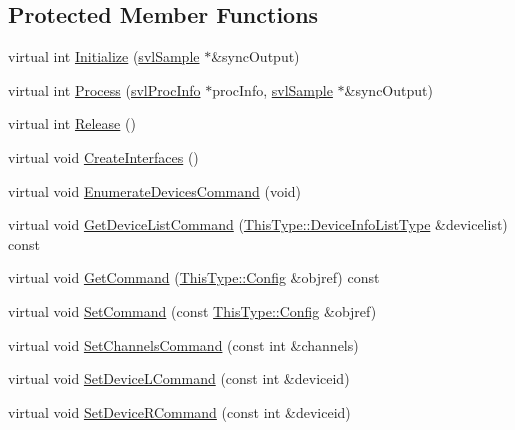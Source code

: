 \subsection*{Protected Member Functions}
\begin{DoxyCompactItemize}
\item 
virtual int \hyperlink{classsvl_filter_source_video_capture_a1da5704a88657e2e84d8215fcbe9e2c3}{Initialize} (\hyperlink{classsvl_sample}{svl\-Sample} $\ast$\&sync\-Output)
\item 
virtual int \hyperlink{classsvl_filter_source_video_capture_a6910f1c5144a593ecd7bfd713944730e}{Process} (\hyperlink{structsvl_proc_info}{svl\-Proc\-Info} $\ast$proc\-Info, \hyperlink{classsvl_sample}{svl\-Sample} $\ast$\&sync\-Output)
\item 
virtual int \hyperlink{classsvl_filter_source_video_capture_a004ca0768d12f5bf38eff0b6274f2beb}{Release} ()
\item 
virtual void \hyperlink{classsvl_filter_source_video_capture_a2fd59f93d8c5e44e67c9dcce01514edd}{Create\-Interfaces} ()
\item 
virtual void \hyperlink{classsvl_filter_source_video_capture_aa910918889f8432791329274497a69d4}{Enumerate\-Devices\-Command} (void)
\item 
virtual void \hyperlink{classsvl_filter_source_video_capture_a50e0b460d69240a109215cae6aa43e5a}{Get\-Device\-List\-Command} (\hyperlink{classsvl_filter_source_video_capture_a52d28d8296c6b85055022a72c69334e4}{This\-Type\-::\-Device\-Info\-List\-Type} \&devicelist) const 
\item 
virtual void \hyperlink{classsvl_filter_source_video_capture_ad5113b583320c5a857766ec6311f2908}{Get\-Command} (\hyperlink{classsvl_filter_source_video_capture_ac541a625ce316b5320170cef3ca02277}{This\-Type\-::\-Config} \&objref) const 
\item 
virtual void \hyperlink{classsvl_filter_source_video_capture_ac506464be36d152e330394bc5598dbf4}{Set\-Command} (const \hyperlink{classsvl_filter_source_video_capture_ac541a625ce316b5320170cef3ca02277}{This\-Type\-::\-Config} \&objref)
\item 
virtual void \hyperlink{classsvl_filter_source_video_capture_ad5362d8c49ab408cc2b2dece5a98dac9}{Set\-Channels\-Command} (const int \&channels)
\item 
virtual void \hyperlink{classsvl_filter_source_video_capture_aee975b68fbf20b1ff832c1cfdfa0b471}{Set\-Device\-L\-Command} (const int \&deviceid)
\item 
virtual void \hyperlink{classsvl_filter_source_video_capture_ac90e7cc9fd637928d42b213a55749a4f}{Set\-Device\-R\-Command} (const int \&deviceid)

\end{DoxyCompactItemize}
